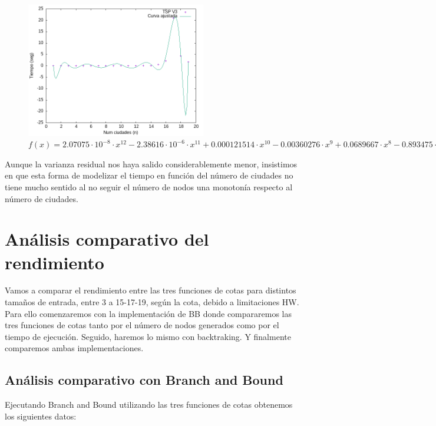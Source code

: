 \documentclass{article}
\begin{document}
\begin{figure}[H]
    \centering
    \includegraphics[width=0.7\textwidth]{imagenes/cota3/tiempos_bb.png}
    \caption*{$f(x)=2.07075 \cdot 10^{-8} \cdot x^{12} -2.38616 \cdot 10^{-6} \cdot x^{11} + 0.000121514 \cdot x^{10} -0.00360276  \cdot x^9 + 0.0689667 \cdot x^8 -0.893475  \cdot x^7 +7.9848  \cdot x^6 -49.2475 \cdot x^5 +206.287 \cdot x^4 -566.434  \cdot x^3 +955.524 \cdot x^2 -874.755 \cdot x +321.485$}
\end{figure}

Aunque la varianza residual nos haya salido considerablemente menor, insistimos en que esta forma de modelizar el tiempo en función del número de ciudades no tiene mucho sentido al no seguir el número de nodos una monotonía respecto al número de ciudades.


\newpage
\section{Análisis comparativo del rendimiento}
Vamos a comparar el rendimiento entre las tres funciones de cotas para distintos tamaños de entrada, entre 3 a 15-17-19, según la cota, debido a limitaciones HW. Para ello comenzaremos con la implementación de BB donde compararemos las tres funciones de cotas tanto por el número de nodos generados como por el tiempo de ejecución. 
Seguido, haremos lo mismo con backtraking. Y finalmente comparemos ambas implementaciones.

\subsection{Análisis comparativo con Branch and Bound}

Ejecutando Branch and Bound utilizando las tres funciones de cotas obtenemos los siguientes datos:
\end{document}
